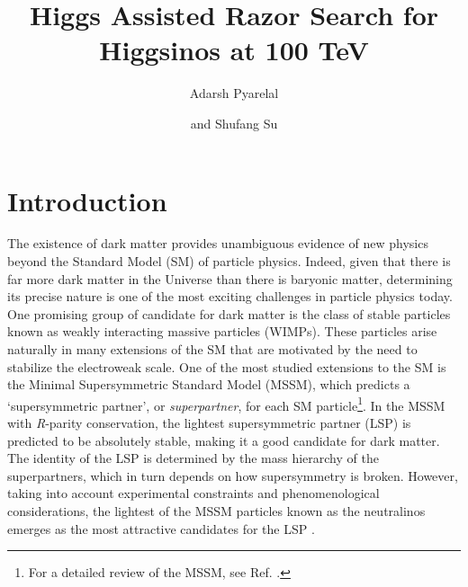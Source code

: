 \documentclass[a4paper,11pt]{article}
\title{Higgs Assisted Razor Search for Higgsinos at 100 TeV}
\author[a]{Adarsh Pyarelal}
\author[b]{and Shufang Su}
\affiliation[a]{School of Information, University of Arizona, Tucson, AZ 85718 , USA}
\affiliation[b]{Department of Physics, University of Arizona, Tucson, AZ 85718, USA}
\begin{document}
 
\maketitle
\flushbottom

\section{Introduction}
 
The existence of dark matter provides unambiguous evidence of new 
physics beyond the Standard Model (SM) of particle physics. Indeed, 
given that there is far more dark matter in the Universe than there 
is baryonic matter, determining its precise nature is one of the most 
exciting challenges in particle physics today.  One promising group 
of candidate for dark matter is the class of stable particles known as 
weakly interacting massive particles (WIMPs). These particles arise 
naturally in many extensions of the SM that are motivated by the need to
stabilize the electroweak scale. One of the most studied extensions
to the SM is the Minimal Supersymmetric Standard Model
(MSSM), which predicts a `supersymmetric partner', or \emph{superpartner}, 
for each SM particle\footnote{For a detailed review of the MSSM, see 
Ref. \cite{Martin:1997ns}.}. In the MSSM with \emph{R}-parity conservation, the 
lightest supersymmetric partner (LSP) is predicted to be absolutely 
stable, making it a good candidate for dark matter. The identity of 
the LSP is determined by the mass hierarchy of the superpartners, 
which in turn depends on how supersymmetry is broken.
However, taking into account experimental constraints and phenomenological 
considerations, the lightest of the  MSSM particles known as the 
neutralinos emerges as the most attractive candidates for the LSP \cite{Bertone:2004pz}. 
\end{document}
